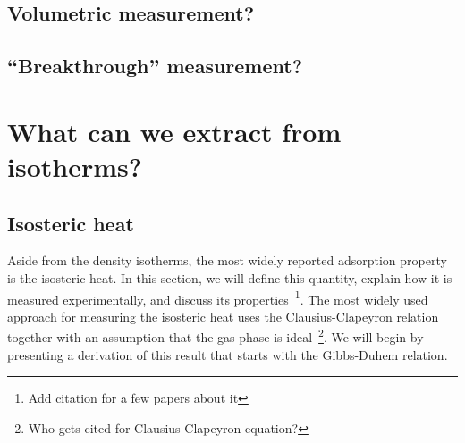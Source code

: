 \documentclass[letterpaper,twocolumn,amsmath,amssymb,jcp,aps,10pt]{revtex4-1}
\begin{document}
\subsection{Volumetric measurement?}
\subsection{``Breakthrough'' measurement?}

\section{What can we extract from isotherms?}

\subsection{Isosteric heat}
Aside from the density isotherms, the most widely reported adsorption property is the isosteric heat.  In this section, we will define this quantity, explain how it is measured experimentally, and discuss its properties~\footnote{Add citation for a few papers about it}.  The most widely used approach for measuring the isosteric heat uses the Clausius-Clapeyron relation together with an assumption that the gas phase is ideal~\footnote{Who gets cited for Clausius-Clapeyron equation?}.  We will begin by presenting a derivation of this result that starts with the Gibbs-Duhem relation.
\end{document}
